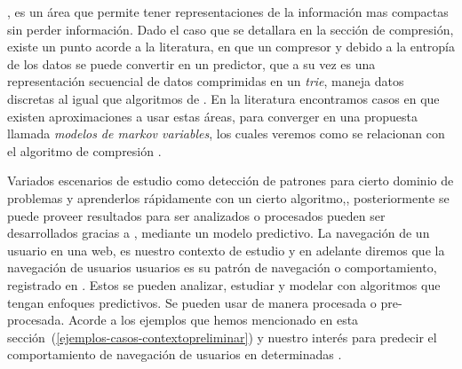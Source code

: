 %
%
%
%
\losslessdatacompression, es un área que permite tener representaciones de la información mas compactas sin perder información. Dado el caso que se detallara en la sección de compresión, existe un punto acorde a la literatura, en que un compresor y debido a la entropía de los datos se puede convertir en un predictor, que a su vez es una representación secuencial de datos comprimidas en un \emph{trie}, maneja datos discretas al igual que algoritmos de \machinelearning. En la literatura encontramos casos en que existen aproximaciones a usar estas áreas, para converger en una propuesta llamada \emph{modelos de markov variables}, los cuales veremos como se relacionan con el algoritmo de compresión \lzSieteOcho.

%
%

Variados escenarios de estudio como  detección de  patrones para cierto dominio de problemas y aprenderlos rápidamente con un cierto algoritmo,, posteriormente se puede proveer resultados para ser analizados o procesados pueden ser desarrollados gracias a \machinelearning, mediante un modelo predictivo.  La navegación de un usuario  en una web, es nuestro contexto de estudio y en adelante diremos que la  navegación de usuarios usuarios es su patrón de navegación o comportamiento, registrado en  \webasccesslog. Estos se pueden analizar, estudiar y modelar con algoritmos que tengan enfoques predictivos. Se pueden usar de manera procesada o pre-procesada. Acorde a los ejemplos que hemos mencionado en esta sección~(\ref{ejemplos-casos-contextopreliminar})  y nuestro interés para predecir el comportamiento de navegación de usuarios en determinadas \webs.



